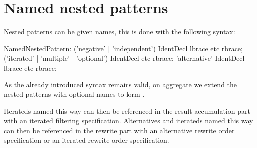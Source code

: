 \section{Named nested patterns}\label{namednested}

Nested patterns can be given names, this is done with the following syntax: 

\begin{rail}  
  NamedNestedPattern: 
    ('negative' | 'independent') IdentDecl lbrace etc rbrace;
    ('iterated' | 'multiple' | 'optional') IdentDecl etc rbrace;
    'alternative' IdentDecl lbrace etc rbrace;
\end{rail}

As the already introduced syntax remains valid, on aggregate we extend the nested patterns with optional names to form .

Iterateds named this way can then be referenced in the result accumulation part with an iterated filtering specification.
Alternatives and iterateds named this way can then be referenced in the rewrite part with an alternative rewrite order specification or an iterated rewrite order specification.

